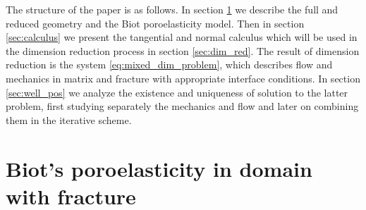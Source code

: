 \documentclass[a4paper]{article}
\numberwithin{equation}{section}
\begin{document}
The structure of the paper is as follows.
In section \ref{sec:model} we describe the full and reduced geometry and the Biot poroelasticity model.
Then in section \ref{sec:calculus} we present the tangential and normal calculus which will be used in the dimension reduction process in section \ref{sec:dim_red}.
The result of dimension reduction is the system \eqref{eq:mixed_dim_problem}, which describes flow and mechanics in matrix and fracture with appropriate interface conditions.
In section \ref{sec:well_pos} we analyze the existence and uniqueness of solution to the latter problem, first studying separately the mechanics and flow and later on combining them in the iterative scheme.


\section{Biot's poroelasticity in domain with fracture}\label{sec:model}
\end{document}
